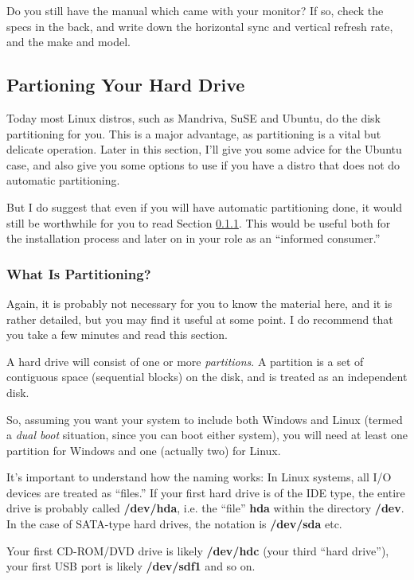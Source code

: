 \documentclass[11pt]{article}
\begin{document}
Do you still have the manual which came with your monitor?  If so, check
the specs in the back, and write down the horizontal sync and vertical
refresh rate, and the make and model.

\subsection{Partioning Your Hard Drive}
\label{part}

Today most Linux distros, such as Mandriva, SuSE and Ubuntu, do the disk
partitioning for you.  This is a major advantage, as partitioning is a
vital but delicate operation.  Later in this section, I'll give you some
advice for the Ubuntu case, and also give you some options to use if you
have a distro that does not do automatic partitioning.  

But I do suggest that even if you will have automatic partitioning done,
it would still be worthwhile for  you to read Section \ref{whatispart}.
This would be useful both for the installation process and later on in
your role as an ``informed consumer.''

\subsubsection{What Is Partitioning?}
\label{whatispart} 

Again, it is probably not necessary for you to know the material here,
and it is rather detailed, but you may find it useful at some point.  I
do recommend that you take a few minutes and read this section.

A hard drive will consist of one or more {\it partitions}.  A partition
is a set of contiguous space (sequential blocks) on the disk, and is
treated as an independent disk.  

So, assuming you want your system to include both Windows and Linux
(termed a {\it dual boot} situation, since you can boot either system),
you will need at least one partition for Windows and one (actually two)
for Linux.

It's important to understand how the naming works: In Linux systems, all
I/O devices are treated as ``files.''  If your first hard drive is of
the IDE type, the entire drive is probably called {\bf /dev/hda}, i.e.
the ``file'' {\bf hda} within the directory {\bf /dev}.  In the case of
SATA-type hard drives, the notation is {\bf /dev/sda} etc.

Your first CD-ROM/DVD drive is likely {\bf /dev/hdc} (your third ``hard
drive''), your first USB port is likely {\bf /dev/sdf1} and so on.
\end{document}
